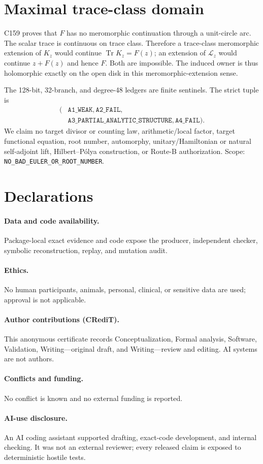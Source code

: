 \documentclass[10pt]{article}
\begin{document}
\section{Maximal trace-class domain}
C159 proves that $F$ has no meromorphic continuation through a unit-circle
arc.  The scalar trace is continuous on trace class.  Therefore a
trace-class meromorphic extension of $K_z$ would continue
$\operatorname{Tr}K_z=F(z)$; an extension of $\mathcal L_z$ would continue
$z+F(z)$ and hence $F$.  Both are impossible.  The induced owner is thus
holomorphic exactly on the open disk in this meromorphic-extension sense.

The 128-bit, 32-branch, and degree-48 ledgers are finite sentinels.  The
strict tuple is
\[
\begin{aligned}
(&\texttt{A1\_WEAK},\texttt{A2\_FAIL},\\[-2pt]
 &\texttt{A3\_PARTIAL\_ANALYTIC\_STRUCTURE},\texttt{A4\_FAIL}).
\end{aligned}
\]
We claim no target divisor or counting law, arithmetic/local factor, target
functional equation, root number, automorphy, unitary/Hamiltonian or natural
self-adjoint lift, Hilbert--P\'olya construction, or Route-B authorization.
Scope: \texttt{NO\_BAD\_EULER\_OR\_ROOT\_NUMBER}.

\section*{Declarations}
\paragraph{Data and code availability.} Package-local exact evidence and
code expose the producer, independent checker, symbolic reconstruction,
replay, and mutation audit.
\paragraph{Ethics.} No human participants, animals, personal, clinical, or
sensitive data are used; approval is not applicable.
\paragraph{Author contributions (CRediT).} This anonymous certificate records
Conceptualization, Formal analysis, Software, Validation, Writing---original
draft, and Writing---review and editing.  AI systems are not authors.
\paragraph{Conflicts and funding.} No conflict is known and no external
funding is reported.
\paragraph{AI-use disclosure.} An AI coding assistant supported drafting,
exact-code development, and internal checking.  It was not an external
reviewer; every released claim is exposed to deterministic hostile tests.
\end{document}
